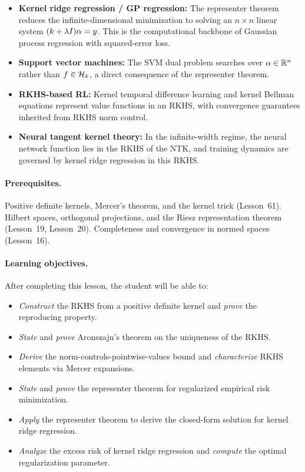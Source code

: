 \documentclass[11pt,a4paper]{article}
\begin{document}
\begin{rlconnection}[title={Why RKHS Theory Matters for RL/ML}]
\begin{itemize}[nosep]
    \item \textbf{Kernel ridge regression / GP regression:} The
    representer theorem reduces the infinite-dimensional minimization
    to solving an $n \times n$ linear system $(k + \lambda I)
    \alpha = y$. This is the computational backbone of Gaussian
    process regression with squared-error loss.
    \item \textbf{Support vector machines:} The SVM dual problem
    searches over $\alpha \in \mathbb{R}^n$ rather than $f \in \mathcal{H}_k$,
    a direct consequence of the representer theorem.
    \item \textbf{RKHS-based RL:} Kernel temporal difference
    learning and kernel Bellman equations represent value functions
    in an RKHS, with convergence guarantees inherited from RKHS
    norm control.
    \item \textbf{Neural tangent kernel theory:} In the infinite-width
    regime, the neural network function lies in the RKHS of the NTK,
    and training dynamics are governed by kernel ridge regression in
    this RKHS.
\end{itemize}
\end{rlconnection}

\paragraph{Prerequisites.}
Positive definite kernels, Mercer's theorem, and the kernel trick
(Lesson~61). Hilbert spaces, orthogonal projections, and the Riesz
representation theorem (Lesson~19, Lesson~20). Completeness and
convergence in normed spaces (Lesson~16).

\paragraph{Learning objectives.}
After completing this lesson, the student will be able to:
\begin{itemize}
    \item \emph{Construct} the RKHS from a positive definite kernel
    and \emph{prove} the reproducing property.
    \item \emph{State} and \emph{prove} Aronszajn's theorem on the
    uniqueness of the RKHS.
    \item \emph{Derive} the norm-controls-pointwise-values bound
    and \emph{characterize} RKHS elements via Mercer expansions.
    \item \emph{State} and \emph{prove} the representer theorem for
    regularized empirical risk minimization.
    \item \emph{Apply} the representer theorem to derive the closed-form
    solution for kernel ridge regression.
    \item \emph{Analyze} the excess risk of kernel ridge regression
    and \emph{compute} the optimal regularization parameter.
\end{itemize}
\end{document}
